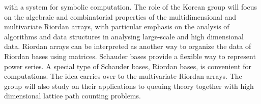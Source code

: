 with a system for symbolic computation. The role of the Korean group
will focus on the algebraic and combinatorial properties of the
multidimensional and multivariate Riordan arrays, with particular
emphasis on the analysis of algorithms and data structures in
analysing large-scale and high dimensional data. Riordan arrays can be
interpreted as another way to organize the data of Riordan bases using
matrices. Schauder bases provide a flexible way to represent power
series. A special type of Schauder bases, Riordan bases, is convenient
for computations. The idea carries over to the multivariate Riordan
arrays. The group will also study on their applications to queuing
theory together with high dimensional lattice path counting problems.

